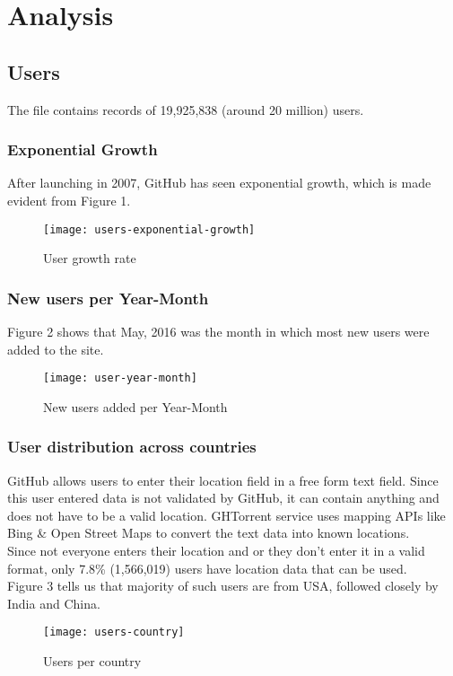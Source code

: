 \newpage

\section{Analysis}

\subsection{Users}

The  file contains records of 19,925,838 (around 20 million) users.

\subsubsection{Exponential Growth}

After launching in 2007, GitHub has seen exponential growth, which is made evident from Figure 1.

\begin{figure}[htb]
\centering
\texttt{[image: users-exponential-growth]}
\caption{User growth rate}
\end{figure}


\subsubsection{New users per Year-Month}

Figure 2 shows that May, 2016 was the month in which most new users were added to the site.

\begin{figure}[htb]
\centering
\texttt{[image: user-year-month]}
\caption{New users added per Year-Month}
\end{figure}

\subsubsection{User distribution across countries}

GitHub allows users to enter their location field in a free form text field. Since this user entered data is not validated by GitHub, it can contain anything and does not have to be a valid location. GHTorrent service uses mapping APIs like Bing \& Open Street Maps to convert the text data into known locations. \\

Since not everyone enters their location and or they don't enter it in a valid format, only 7.8\% (1,566,019) users have location data that can be used. \\

Figure 3 tells us that majority of such users are from USA, followed closely by India and China.


\begin{figure}[htb]
\centering
\texttt{[image: users-country]}
\caption{Users per country}
\end{figure}
